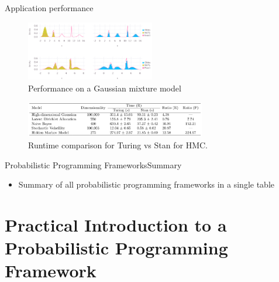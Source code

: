 \documentclass[AERbeamer%
              ,optEnglish%
              ,optBiber%
              ,optBibstyleAlphabetic%
              ,optBeamerClassicFormat%
              ]{AERlatex}%
\begin{document}
\begin{frame}[c]{Application performance}
    \centering
    \begin{figure}
        \centering
        \includegraphics[width=0.5\textwidth]{TuringAppPerformanceNUTSvsGibbs.png}
        \caption{Performance on a Gaussian mixture model}
    \end{figure}
    \begin{figure}
        \centering
        \includegraphics[width=0.7\textwidth]{TuringPerformancevsStanHMC.png}
        \caption{Runtime comparison for Turing vs Stan for HMC.}
    \end{figure}
\end{frame}


\begin{frame}[c]{Probabilistic Programming Frameworks}{Summary}
    \centering
    \begin{itemize}
        \item Summary of all probabilistic programming frameworks in a single table
    \end{itemize}
\end{frame}



\section{Practical Introduction to a Probabilistic Programming Framework}
\end{document}
